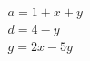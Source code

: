 $
      \begin{gather}
      a = 1 + x + y \\
      d = 4 - y     \\
      g = 2x - 5y
      \end{gather}
$
